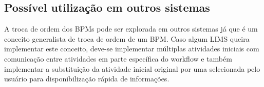 \subsection{Possível utilização em outros sistemas}

A troca de ordem dos BPMs pode ser explorada em outros sistemas já que é um conceito generalista de troca de ordem de um BPM. Caso algum LIMS queira implementar este conceito, deve-se implementar múltiplas atividades iniciais com comunicação entre atividades em parte específica do workflow e também implementar a substituição da atividade inicial original por uma selecionada pelo usuário para disponibilização rápida de informações.

